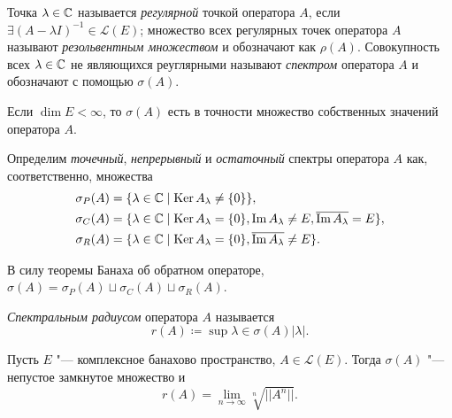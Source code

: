 \documentclass[main]{subfiles}
\begin{document}
\begin{definition}
  Точка \( \lambda \in \mathbb{C} \) называется \emph{регулярной}
  точкой оператора \( A \), если
  \( \exists (A - \lambda I)^{-1} \in \mathcal{L}(E) \);
  множество всех регулярных точек оператора \( A \)
  называют \emph{резольвентным множеством} и
  обозначают как \( \rho(A) \).
  Совокупность всех \( \lambda \in \mathbb{C} \)
  не являющихся реуглярными
  называют \emph{спектром} оператора \( A \) и
  обозначают с помощью \( \sigma(A) \).
\end{definition}

\begin{remark}
  Если \( \dim E < \infty \),
  то \( \sigma(A) \) есть в точности
  множество собственных значений оператора \( A \).
\end{remark}

\begin{definition}
  Определим \emph{точечный}, \emph{непрерывный}
  и \emph{остаточный} спектры оператора \( A \) как,
  соответственно, множества
  \begin{align}
    \sigma_P(A) &= \{ \lambda \in \mathbb{C} \mid
      \operatorname{Ker} A_\lambda \ne \{ 0 \}
    \}, \\
    \sigma_C(A) &= \{ \lambda \in \mathbb{C} \mid
      \operatorname{Ker} A_\lambda = \{ 0 \}, \operatorname{Im} A_\lambda \ne E,
      \overline{\operatorname{Im} A_\lambda} = E
    \}, \\
    \sigma_R(A) &= \{ \lambda \in \mathbb{C} \mid
      \operatorname{Ker} A_\lambda = \{ 0 \}, \overline{\operatorname{Im} A_\lambda} \ne E
    \}. \\
  \end{align}
\end{definition}

\begin{remark}
  В силу теоремы Банаха об обратном операторе,
  \( \sigma(A) = \sigma_P(A) \sqcup \sigma_C(A) \sqcup \sigma_R(A) \).
\end{remark}

\begin{definition}
  \emph{Спектральным радиусом} оператора \( A \) называется
  \[
    r(A) \coloneqq \sup{\lambda \in \sigma(A)} |\lambda|.
  \]
\end{definition}

\begin{theorem}\label{thm:spectrum}
  Пусть \( E \) "--- комплексное банахово пространство,
  \( A \in \mathcal{L}(E) \).
  Тогда \( \sigma(A) \) "--- непустое замкнутое множество
  и
  \[
    r(A) =
    \lim_{n \to \infty} \sqrt[n]{||A^n||}.
  \]
\end{theorem}
\end{document}
